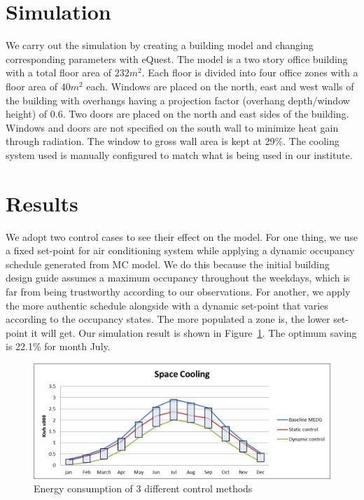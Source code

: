 \documentclass{sig-alternate}
\begin{document}
\section{Simulation}
\label{sec:simulation}

We carry out the simulation by creating a building model and changing corresponding
parameters with eQuest. The model is a two story office building
with a total floor area of $232m^{2}$. Each floor is divided into four
office zones with a floor area of $40m^{2}$ each. Windows are placed on
the north, east and west walls of the building with overhangs having a
projection factor (overhang depth/window height) of $0.6$. Two doors
are placed on the north and east sides of the building. Windows and
doors are not specified on the south wall to minimize heat gain
through radiation. The window to gross wall area is kept at 29\%. The
cooling system used is manually configured to match what is being used
in our institute.


\section{Results}
\label{sec:results}
We adopt two control cases to see their effect on the model. For one
thing, we use a fixed set-point for air conditioning system while
applying a dynamic occupancy schedule generated from MC model. We do
this because the initial building design guide assumes a maximum
occupancy throughout the weekdays, which is far from being trustworthy
according to our observations. For another, we apply the more
authentic schedule alongside with a dynamic set-point that varies
according to the occupancy states. The more populated a zone is, the
lower set-point it will get. Our simulation result is shown in
Figure~\ref{fig:energy-consumption}. The optimum saving is 22.1\% for
month July. 

\begin{figure}[!tb]
  \centering
  \includegraphics[scale=0.35]{sc}
  \caption{Energy consumption of 3 different control methods}
  \label{fig:energy-consumption}
\end{figure}
\end{document}
